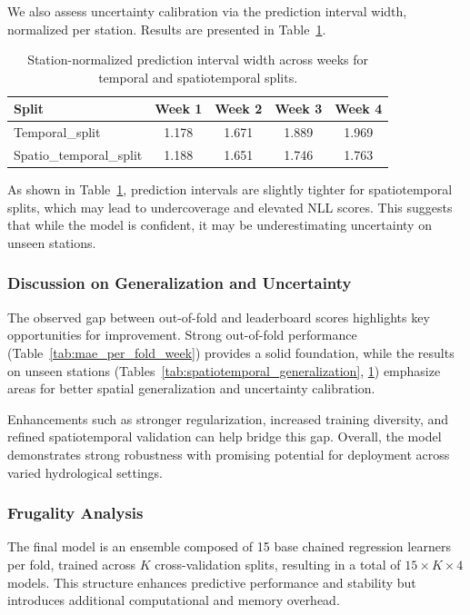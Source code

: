 \documentclass[ruler]{CUP-JNL-EDS}%
\begin{document}
We also assess uncertainty calibration via the prediction interval width, normalized per station. Results are presented in Table~\ref{tab:normalized_interval_width}.

\begin{table}[ht]
\centering
\begin{tabular}{lcccc}
\hline
\textbf{Split} & \textbf{Week 1} & \textbf{Week 2} & \textbf{Week 3} & \textbf{Week 4} \\
\hline
Temporal\_split & 1.178 & 1.671 & 1.889 & 1.969 \\
Spatio\_temporal\_split & 1.188 & 1.651 & 1.746 & 1.763 \\
\hline
\end{tabular}
\caption{Station-normalized prediction interval width across weeks for temporal and spatiotemporal splits.}
\label{tab:normalized_interval_width}
\end{table}

\noindent As shown in Table~\ref{tab:normalized_interval_width}, prediction intervals are slightly tighter for spatiotemporal splits, which may lead to undercoverage and elevated NLL scores. This suggests that while the model is confident, it may be underestimating uncertainty on unseen stations.

\subsubsection*{Discussion on Generalization and Uncertainty}

The observed gap between out-of-fold and leaderboard scores highlights key opportunities for improvement. Strong out-of-fold performance (Table~\ref{tab:mae_per_fold_week}) provides a solid foundation, while the results on unseen stations (Tables~\ref{tab:spatiotemporal_generalization}, \ref{tab:normalized_interval_width}) emphasize areas for better spatial generalization and uncertainty calibration.

Enhancements such as stronger regularization, increased training diversity, and refined spatiotemporal validation can help bridge this gap. Overall, the model demonstrates strong robustness with promising potential for deployment across varied hydrological settings.


\subsubsection{Frugality Analysis}
\label{sec:frugality}
The final model is an ensemble composed of 15 base chained regression learners per fold, trained across $K$ cross-validation splits, resulting in a total of $15 \times K \times 4$  models. This structure enhances predictive performance and stability but introduces additional computational and memory overhead.
\end{document}
